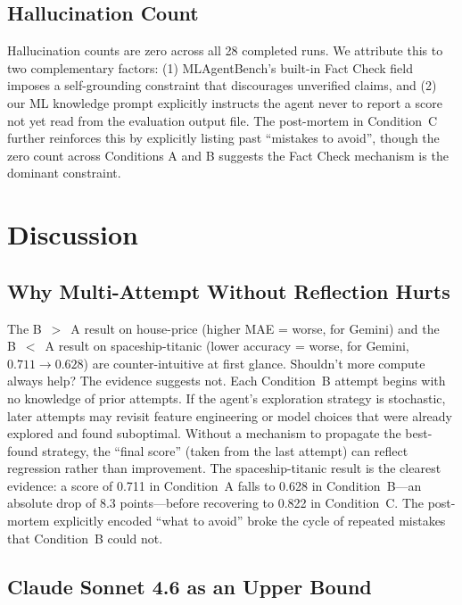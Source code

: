\documentclass[conference]{IEEEtran}
\begin{document}
\subsection{Hallucination Count}

Hallucination counts are zero across all 28 completed runs. We attribute this
to two complementary factors: (1) MLAgentBench's built-in Fact Check field
imposes a self-grounding constraint that discourages unverified claims, and (2)
our ML knowledge prompt explicitly instructs the agent never to report a score
not yet read from the evaluation output file. The post-mortem in Condition~C
further reinforces this by explicitly listing past ``mistakes to avoid'',
though the zero count across Conditions A and B suggests the Fact Check
mechanism is the dominant constraint.

\section{Discussion}

\subsection{Why Multi-Attempt Without Reflection Hurts}

The B~$>$~A result on house-price (higher MAE = worse, for Gemini) and the
B~$<$~A result on spaceship-titanic (lower accuracy = worse, for Gemini,
$0.711\!\to\!0.628$) are counter-intuitive at first glance. Shouldn't more
compute always help? The evidence suggests not. Each Condition~B attempt begins
with no knowledge of prior attempts. If the agent's exploration strategy is
stochastic, later attempts may revisit feature engineering or model choices that
were already explored and found suboptimal. Without a mechanism to propagate
the best-found strategy, the ``final score'' (taken from the last attempt) can
reflect regression rather than improvement. The spaceship-titanic result is the
clearest evidence: a score of 0.711 in Condition~A falls to 0.628 in
Condition~B---an absolute drop of 8.3 points---before recovering to 0.822 in
Condition~C. The post-mortem explicitly encoded ``what to avoid'' broke the
cycle of repeated mistakes that Condition~B could not.

\subsection{Claude Sonnet 4.6 as an Upper Bound}
\end{document}
